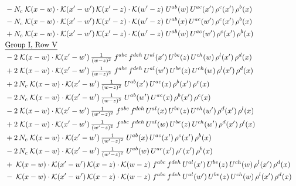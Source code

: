 \documentclass[10pt]{article}
\numberwithin{equation}{section}
\begin{document}
\begin{align}
&\quad -N_c\;\mathcal{K}(x-w)\cdot\mathcal{K}(x'-w')\,\mathcal{K}(x'-z)\cdot\mathcal{K}(w'-z)\;U^{ab}(w)\,U^{ac}(x')\,\rho^{c}(x')\,\rho^{b}(x)\notag\\
&\quad -N_c\;\mathcal{K}(x-w)\cdot\mathcal{K}(x'-w')\,\mathcal{K}(x'-z)\cdot\mathcal{K}(w'-z)\;U^{ab}(x)\,U^{ac}(w')\,\rho^{c}(x')\,\rho^{b}(x)\notag\\
&\quad +N_c\;\mathcal{K}(x-w)\cdot\mathcal{K}(x'-w')\,\mathcal{K}(x'-z)\cdot\mathcal{K}(w'-z)\;U^{ab}(w)\,U^{ac}(w')\,\rho^{c}(x')\,\rho^{b}(x)\notag\\
&\quad\underline{\text{Group I, Row V}}\notag\\
&\quad -2\;\mathcal{K}(x-w)\cdot\mathcal{K}(x'-w')\,\tfrac{1}{(w-z)^{2}}\;f^{abc}\,f^{deh}\,U^{al}(x')\,U^{be}(z)\,U^{ch}(w)\,\rho^{l}(x')\,\rho^{d}(x)\notag\\
&\quad +2\;\mathcal{K}(x-w)\cdot\mathcal{K}(x'-w')\,\tfrac{1}{(w-z)^{2}}\;f^{abc}\,f^{deh}\,U^{al}(w')\,U^{be}(z)\,U^{ch}(w)\,\rho^{l}(x')\,\rho^{d}(x)\notag\\
&\quad +2\,N_c\;\mathcal{K}(x-w)\cdot\mathcal{K}(x'-w')\,\tfrac{1}{(w-z)^{2}}\;U^{ab}(x')\,U^{ac}(x)\,\rho^{b}(x')\,\rho^{c}(x)\notag\\
&\quad -2\,N_c\;\mathcal{K}(x-w)\cdot\mathcal{K}(x'-w')\,\tfrac{1}{(w-z)^{2}}\;U^{ab}(w')\,U^{ac}(x)\,\rho^{b}(x')\,\rho^{c}(x)\notag\\
&\quad -2\;\mathcal{K}(x-w)\cdot\mathcal{K}(x'-w')\,\tfrac{1}{(w'-z)^{2}}\;f^{abc}\,f^{deh}\,U^{al}(x)\,U^{be}(z)\,U^{ch}(w')\,\rho^{d}(x')\,\rho^{l}(x)\notag\\
&\quad +2\;\mathcal{K}(x-w)\cdot\mathcal{K}(x'-w')\,\tfrac{1}{(w'-z)^{2}}\;f^{abc}\,f^{deh}\,U^{al}(w)\,U^{be}(z)\,U^{ch}(w')\,\rho^{d}(x')\,\rho^{l}(x)\notag\\
&\quad +2\,N_c\;\mathcal{K}(x-w)\cdot\mathcal{K}(x'-w')\,\tfrac{1}{(w'-z)^{2}}\;U^{ab}(x)\,U^{ac}(x')\,\rho^{c}(x')\,\rho^{b}(x)\notag\\
&\quad -2\,N_c\;\mathcal{K}(x-w)\cdot\mathcal{K}(x'-w')\,\tfrac{1}{(w'-z)^{2}}\;U^{ab}(w)\,U^{ac}(x')\,\rho^{c}(x')\,\rho^{b}(x)\notag\\
&\quad +\;\mathcal{K}(x-w)\cdot\mathcal{K}(x'-w')\,\mathcal{K}(x-z)\cdot\mathcal{K}(w-z)\;f^{abc}\,f^{deh}\,U^{al}(x')\,U^{be}(z)\,U^{ch}(w)\,\rho^{l}(x')\,\rho^{d}(x)\notag\\
&\quad -\;\mathcal{K}(x-w)\cdot\mathcal{K}(x'-w')\,\mathcal{K}(x-z)\cdot\mathcal{K}(w-z)\;f^{abc}\,f^{deh}\,U^{al}(w')\,U^{be}(z)\,U^{ch}(w)\,\rho^{l}(x')\,\rho^{d}(x)\notag\\

\end{align}
\end{document}
